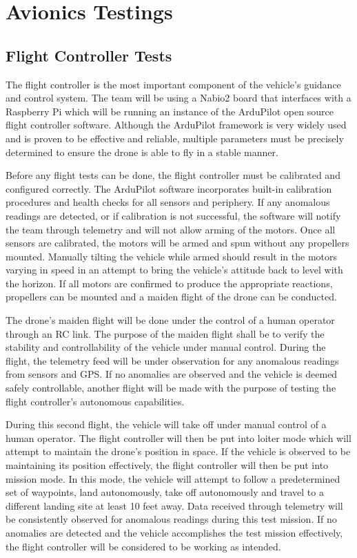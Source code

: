 \section{Avionics Testings}\label{PL:Testing:Avionics}
	\subsection{Flight Controller Tests}
	The flight controller is the most important component of the vehicle’s guidance and control system. The team will be using a Nabio2 board that  interfaces with a Raspberry Pi which will be running an instance of the ArduPilot open source flight controller software. Although the ArduPilot framework is very widely used and is proven to be effective and reliable, multiple parameters must be precisely determined to ensure the drone is able to fly in a stable manner.

	Before any flight tests can be done, the flight controller must be calibrated and configured correctly. The ArduPilot software incorporates built-in calibration procedures and health checks for all sensors and periphery. If any anomalous readings are detected, or if calibration is not successful, the software will notify the team through telemetry and will not allow arming of the motors. Once all sensors are calibrated, the motors will be armed and spun without any propellers mounted. Manually tilting the vehicle while armed should result in the motors varying in speed in an attempt to bring the vehicle’s attitude back to level with the horizon. If all motors are confirmed to produce the appropriate reactions, propellers can be mounted and a maiden flight of the drone can be conducted.
	
	The drone’s maiden flight will be done under the control of a human operator through an RC link. The purpose of the maiden flight shall be to verify the stability and controllability of the vehicle under manual control. During the flight, the telemetry feed will be under observation for any anomalous readings from sensors and GPS. If no anomalies are observed and the vehicle is deemed safely controllable, another flight will be made with the purpose of testing the flight controller’s autonomous capabilities.
	
	During this second flight, the vehicle will take off under manual control of a human operator. The flight controller will then be put into loiter mode which will attempt to maintain the drone’s position in space. If the vehicle is observed to be maintaining its position effectively, the flight controller will then be put into mission mode. In this mode, the vehicle will attempt to follow a predetermined set of waypoints, land autonomously, take off autonomously and travel to a different landing site at least 10 feet away. Data received through telemetry will be consistently observed for anomalous readings during this test mission. If no anomalies are detected and the vehicle accomplishes the test mission effectively, the flight controller will be considered to be working as intended.
	

